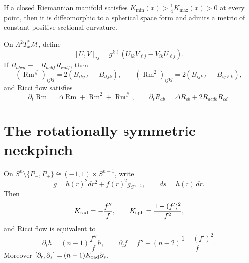 \begin{theorem}
\label{thm:chow-ii-appd-quarter-pinched-space-form}
If a closed Riemannian manifold satisfies
$K_{\min}(x)>\frac14K_{\max}(x)>0$ at every point, then it is diffeomorphic
to a spherical space form and admits a metric of constant positive sectional
curvature.
\end{theorem}

\begin{definition}
\label{def:chow-ii-appd-curvature-operator-evolution}
On $\Lambda^2T_x^*\mathcal M$, define
\[
 [U,V]_{ij}=g^{k\ell}(U_{ik}V_{\ell j}-V_{ik}U_{\ell j}).
\]
If $B_{abcd}=-R_{aebf}R_{cedf}$, then
\[
 (\operatorname{Rm}^{\#})_{ijkl}=2(B_{ikj\ell}-B_{iljk}),\qquad
 (\operatorname{Rm}^{2})_{ijkl}=2(B_{ijk\ell}-B_{ij\ell k}),
\]
and Ricci flow satisfies
\[
 \partial_t\operatorname{Rm}=\Delta\operatorname{Rm}
   +\operatorname{Rm}^{2}+\operatorname{Rm}^{\#},\qquad
 \partial_tR_{ab}=\Delta R_{ab}+2R_{acdb}R_{cd}.
\]
\end{definition}

\section{The rotationally symmetric neckpinch}

\begin{definition}
\label{def:chow-ii-appd-rotationally-symmetric-flow}
On $S^n\setminus\{P_-,P_+\}\cong(-1,1)\times S^{n-1}$, write
\[
 g=h(r)^2dr^2+f(r)^2g_{S^{n-1}},\qquad ds=h(r)\,dr.
\]
Then
\[
 K_{\rm rad}=-\frac{f''}{f},\qquad
 K_{\rm sph}=\frac{1-(f')^2}{f^2},
\]
and Ricci flow is equivalent to
\[
 \partial_th=(n-1)\frac{f''}{f}h,\qquad
 \partial_tf=f''-(n-2)\frac{1-(f')^2}{f}.
\]
Moreover
$[\partial_t,\partial_s]=(n-1)K_{\rm rad}\partial_s$.
\end{definition}

